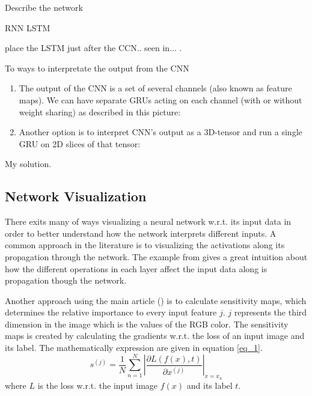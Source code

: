 Describe the network

RNN LSTM


place the LSTM just after the CCN.. seen in... \cite{}. 


\cite{git_lstm}


\cite{git_rnn_cnn_1}



To ways to interpretate the output from the CNN
\begin{enumerate}
\item The output of the CNN is a set of several channels (also known as feature maps). We can have separate GRUs acting on each channel (with or without weight sharing) as described in this picture:
\item Another option is to interpret CNN’s output as a 3D-tensor and run a single GRU on 2D slices of that tensor:
\end{enumerate}


My solution.



\subsection{Network Visualization}

There exits many of ways visualizing a neural network w.r.t. its input data in order to better understand how the network interprets different inputs.  A common approach in the literature is to visualizing the activations along its propagation through the network. The example from \cite{stand_cnn} gives a great intuition about how the different operations in each layer affect the input data along is propagation though the network. 

Another approach using the main article (\cite{main_ar}) is to calculate sensitivity maps, which determines the relative importance to every input feature $j$. $j$ represents the third dimension in the image which is the values of the RGB color.
The sensitivity maps is created by calculating the gradients w.r.t. the loss of an input image and its label. The mathematically expression are given in equation \ref{eq_1}.
\begin{equation}
s^{\left(j\right)} = \frac { 1 }{ N  } \sum _{ n=1 }^{ N } \left| \frac { \partial L\left( f\left( x \right) ,t \right)  }{ \partial x^{ \left( j \right)  } }  \right| _{x=x_n}
\label{eq_1}
\end{equation}
where $L$ is the loss w.r.t. the input image $f\left(x\right)$ and its label $t$. 

